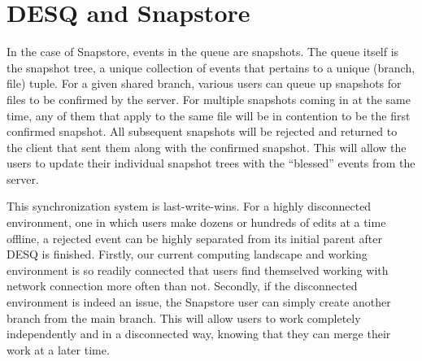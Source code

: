 \section{DESQ and Snapstore}

In the case of Snapstore, events in the queue are snapshots. The queue itself is the snapshot tree, a unique collection of events that pertains to a unique (branch, file) tuple. For a given shared branch, various users can queue up snapshots for files to be confirmed by the server. For multiple snapshots coming in at the same time, any of them that apply to the same file will be in contention to be the first confirmed snapshot. All subsequent snapshots will be rejected and returned to the client that sent them along with the confirmed snapshot. This will allow the users to update their individual snapshot trees with the ``blessed'' events from the server.

This synchronization system is last-write-wins. For a highly disconnected environment, one in which users make dozens or hundreds of edits at a time offline, a rejected event can be highly separated from its initial parent after DESQ is finished. Firstly, our current computing landscape and working environment is so readily connected that users find themselved working with network connection more often than not. Secondly, if the disconnected environment is indeed an issue, the Snapstore user can simply create another branch from the main branch. This will allow users to work completely independently and in a disconnected way, knowing that they can merge their work at a later time.


